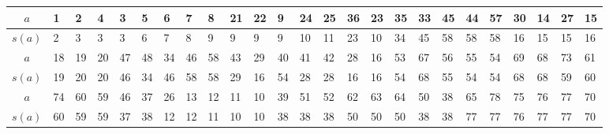 \begin{center}
\begin{minipage}{\textwidth}
\renewcommand{\arraystretch}{1.2}
\begin{scriptsize}
\begin{tabular}{|c|*{24}{|p{.15cm}}|}
\hline
$a$&1&2&4&3&5&6&7&8&21&22&9&24&25&36&23&35&33&45&44&57&30&14&27&15 \\
\hline
$s(a)$&2&3&3&3&6&7&8&9&9&9&9&10&11&23&10&34&45&58&58&58&16&15&15&16\\
\hline \hline
$a$&18&19&20&47&48&34&46&58&43&29&40&41&42&28&16&53&67&56&55&54&69&68&73&61\\
\hline
$s(a)$&19&20&20&46&34&46&58&58&29&16&54&28&28&16&16&54&68&55&54&54&68&68&59&60\\
\hline \hline
$a$&74&60&59&46&37&26&13&12&11&10&39&51&52&62&63&64&50&38&65&78&75&76&77&70\\
\hline
$s(a)$&60&59&59&37&38&12&12&11&10&10&38&38&38&50&50&50&38&38&77&77&76&77&77&70\\
\hline
\end{tabular}
\label{Beispiel_HF_Zickzack_unterteilt_mit_Hubausrichtung}
\end{scriptsize} 
\renewcommand{\arraystretch}{1}


\end{minipage}
\end{center}
